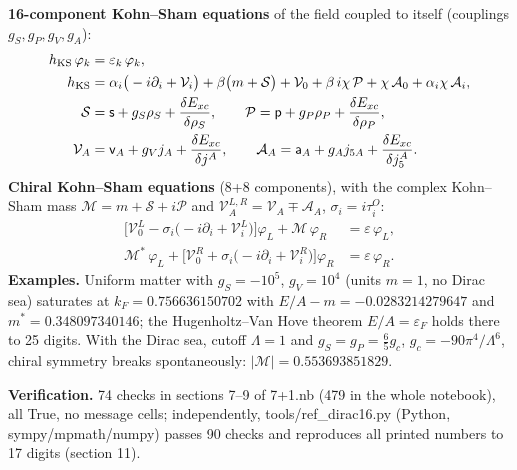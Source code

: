 \documentclass[10pt,a4paper]{article}
\begin{document}
\textbf{16-component Kohn–Sham equations} of the field coupled to itself (couplings $g_S,g_P,g_V,g_A$):
\begin{align*}
h_{\rm KS}\,\varphi_k&=\varepsilon_k\,\varphi_k, \\
h_{\rm KS}&=\alpha_i\big(-i\partial_i+\mathcal V_i\big)+\beta\big(m+\mathcal S\big)+\mathcal V_0+\beta\,i\chi\,\mathcal P+\chi\,\mathcal A_0+\alpha_i\chi\,\mathcal A_i, \\
\mathcal S&=\mathsf s+g_S\rho_S+\frac{\delta E_{xc}}{\delta\rho_S},\qquad \mathcal P=\mathsf p+g_P\rho_P+\frac{\delta E_{xc}}{\delta\rho_P}, \\
\mathcal V_A&=\mathsf v_A+g_Vj_A+\frac{\delta E_{xc}}{\delta j^A},\qquad \mathcal A_A=\mathsf a_A+g_Aj_{5A}+\frac{\delta E_{xc}}{\delta j_5^A}.
\end{align*}
\textbf{Chiral Kohn–Sham equations} (8+8 components), with the complex Kohn–Sham mass $\mathcal M=m+\mathcal S+i\mathcal P$ and $\mathcal V^{L,R}_A=\mathcal V_A\mp\mathcal A_A$, $\sigma_i=i\tau^{O}_i$:
\begin{align*}
\big[\mathcal V^L_0-\sigma_i\big(-i\partial_i+\mathcal V^L_i\big)\big]\varphi_L+\mathcal M\,\varphi_R&=\varepsilon\,\varphi_L, \\
\mathcal M^*\,\varphi_L+\big[\mathcal V^R_0+\sigma_i\big(-i\partial_i+\mathcal V^R_i\big)\big]\varphi_R&=\varepsilon\,\varphi_R .
\end{align*}
\textbf{Examples.} Uniform matter with $g_S=-10^5$, $g_V=10^4$ (units $m=1$, no Dirac sea) saturates at $k_F=0.756636150702$ with $E/A-m=-0.0283214279647$ and $m^*=0.348097340146$; the Hugenholtz–Van Hove theorem $E/A=\varepsilon_F$ holds there to 25 digits. With the Dirac sea, cutoff $\Lambda=1$ and $g_S=g_P=\tfrac65g_c$, $g_c=-90\pi^4/\Lambda^6$, chiral symmetry breaks spontaneously: $|\mathcal M|=0.553693851829$.

\textbf{Verification.} 74 checks in sections 7–9 of 7+1.nb (479 in the whole notebook), all True, no message cells; independently, tools/ref\_dirac16.py (Python, sympy/mpmath/numpy) passes 90 checks and reproduces all printed numbers to 17 digits (section 11).
\end{document}
